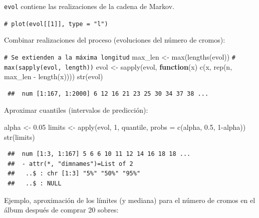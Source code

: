 \documentclass[
]{book}
\newenvironment{Shaded}{\begin{snugshade}}{\end{snugshade}}
\newcommand{\AttributeTok}[1]{\textcolor[rgb]{0.77,0.63,0.00}{#1}}
\newcommand{\CommentTok}[1]{\textcolor[rgb]{0.56,0.35,0.01}{\textit{#1}}}
\newcommand{\ControlFlowTok}[1]{\textcolor[rgb]{0.13,0.29,0.53}{\textbf{#1}}}
\newcommand{\DecValTok}[1]{\textcolor[rgb]{0.00,0.00,0.81}{#1}}
\newcommand{\FloatTok}[1]{\textcolor[rgb]{0.00,0.00,0.81}{#1}}
\newcommand{\FunctionTok}[1]{\textcolor[rgb]{0.00,0.00,0.00}{#1}}
\newcommand{\NormalTok}[1]{#1}
\newcommand{\OtherTok}[1]{\textcolor[rgb]{0.56,0.35,0.01}{#1}}
\newcommand{\SpecialCharTok}[1]{\textcolor[rgb]{0.00,0.00,0.00}{#1}}
\theoremstyle{break}
\theoremstyle{nonumberplain}
\renewcommand{\CommentTok}[1]{\textcolor[rgb]{0.41,0.41,0.41}{\texttt{#1}}}
\begin{document}
\texttt{evol} contiene las realizaciones de la cadena de Markov.

\begin{Shaded}
\begin{Highlighting}[]
\CommentTok{\# plot(evol[[1]], type = "l")}
\end{Highlighting}
\end{Shaded}

Combinar realizaciones del proceso (evoluciones del número de cromos):

\begin{Shaded}
\begin{Highlighting}[]
\CommentTok{\# Se extienden a la máxima longitud}
\NormalTok{max\_len }\OtherTok{\textless{}{-}} \FunctionTok{max}\NormalTok{(}\FunctionTok{lengths}\NormalTok{(evol)) }\CommentTok{\# max(sapply(evol, length))}
\NormalTok{evol }\OtherTok{\textless{}{-}} \FunctionTok{sapply}\NormalTok{(evol, }\ControlFlowTok{function}\NormalTok{(x) }\FunctionTok{c}\NormalTok{(x, }\FunctionTok{rep}\NormalTok{(n, max\_len }\SpecialCharTok{{-}} \FunctionTok{length}\NormalTok{(x))))}
\FunctionTok{str}\NormalTok{(evol)}
\end{Highlighting}
\end{Shaded}

\begin{verbatim}
 ##  num [1:167, 1:2000] 6 12 16 21 23 25 30 34 37 38 ...
\end{verbatim}

Aproximar cuantiles (intervalos de predicción):

\begin{Shaded}
\begin{Highlighting}[]
\NormalTok{alpha }\OtherTok{\textless{}{-}} \FloatTok{0.05}
\NormalTok{limits }\OtherTok{\textless{}{-}} \FunctionTok{apply}\NormalTok{(evol, }\DecValTok{1}\NormalTok{, quantile, }\AttributeTok{probs =} \FunctionTok{c}\NormalTok{(alpha, }\FloatTok{0.5}\NormalTok{, }\DecValTok{1}\SpecialCharTok{{-}}\NormalTok{alpha))}
\FunctionTok{str}\NormalTok{(limits)}
\end{Highlighting}
\end{Shaded}

\begin{verbatim}
 ##  num [1:3, 1:167] 5 6 6 10 11 12 14 16 18 18 ...
 ##  - attr(*, "dimnames")=List of 2
 ##   ..$ : chr [1:3] "5%" "50%" "95%"
 ##   ..$ : NULL
\end{verbatim}

Ejemplo, aproximación de los límites (y mediana) para el número de cromos en el álbum después de comprar 20 sobres:
\end{document}
